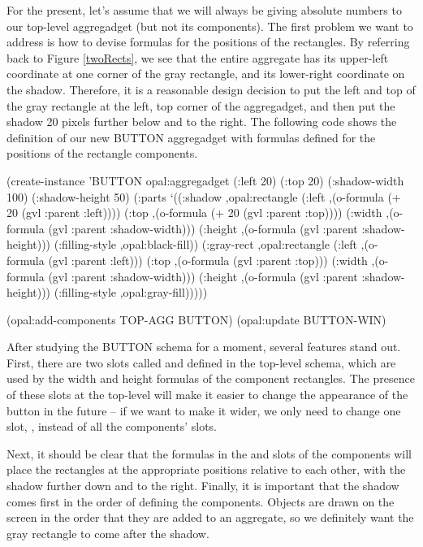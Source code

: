 For the present, let's assume that we will always be giving absolute
numbers to our top-level aggregadget (but not its components).  The first
problem we want to address
is how to devise formulas for the positions of the rectangles.
By referring back to Figure \ref{twoRects},
we see that the entire aggregate has its upper-left
coordinate at one corner of the gray rectangle, and its lower-right
coordinate on the shadow.  Therefore, it is a reasonable design
decision to put the left and top of the gray rectangle at the left,
top corner of the aggregadget, and then put the shadow 20 pixels
further below and to the right.  The following code shows the
definition of our new BUTTON aggregadget with formulas defined for the
positions of the rectangle components.

\begin{programexample}
(create-instance 'BUTTON opal:aggregadget
   (:left 20) (:top 20)
   (:shadow-width 100) (:shadow-height 50)
   (:parts
    `((:shadow ,opal:rectangle
	       (:left ,(o-formula (+ 20 (gvl :parent :left))))
	       (:top ,(o-formula (+ 20 (gvl :parent :top))))
	       (:width ,(o-formula (gvl :parent :shadow-width)))
	       (:height ,(o-formula (gvl :parent :shadow-height)))
	       (:filling-style ,opal:black-fill))
      (:gray-rect ,opal:rectangle
		  (:left ,(o-formula (gvl :parent :left)))
		  (:top ,(o-formula (gvl :parent :top)))
		  (:width ,(o-formula (gvl :parent :shadow-width)))
		  (:height ,(o-formula (gvl :parent :shadow-height)))
		  (:filling-style ,opal:gray-fill)))))

(opal:add-components TOP-AGG BUTTON)
(opal:update BUTTON-WIN)
\end{programexample}

After studying the BUTTON schema for a moment, several features stand out.
First, there are two slots called  and
 defined in the top-level schema, which are used by
the width and height formulas of the component rectangles.  The
presence of these slots at the top-level will make it easier to change
the appearance of the button in the future -- if we want to make it
wider, we only need to change one slot, , instead
of all the components'  slots.

Next, it should be clear that the formulas in the  and
 slots of the components will place the rectangles at the
appropriate positions relative to each other, with the shadow further
down and to the right.  Finally, it is important that the shadow comes
first in the order of defining the components.  Objects are drawn on
the screen in the order that they are added to an aggregate, so we
definitely want the gray rectangle to come after the shadow.

